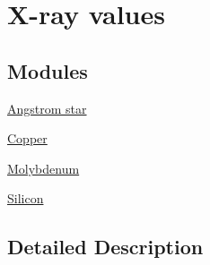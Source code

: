 \hypertarget{group___x-ray}{}\section{X-\/ray values}
\label{group___x-ray}
\subsection*{Modules}
\begin{DoxyCompactItemize}
\item 
\hyperlink{group___angstrom_star}{Angstrom star}
\item 
\hyperlink{group___copper}{Copper}
\item 
\hyperlink{group___molybdenum}{Molybdenum}
\item 
\hyperlink{group___silicon}{Silicon}
\end{DoxyCompactItemize}


\subsection{Detailed Description}
